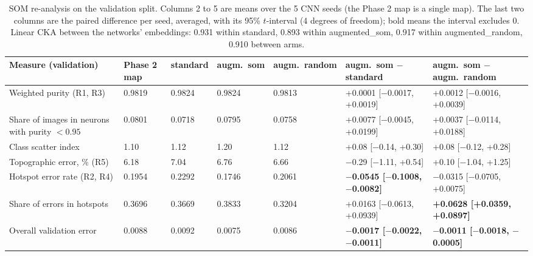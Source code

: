 \begin{table}[H]
\centering
\renewcommand{\arraystretch}{1.12}
\footnotesize
{\setlength{\tabcolsep}{3pt}\begin{tabular}{|>{\raggedright\arraybackslash}p{}|C{0.08\textwidth}|C{0.085\textwidth}|C{0.09\textwidth}|C{0.09\textwidth}|C{0.185\textwidth}|C{0.185\textwidth}|}
\hline
\textbf{Measure (validation)} & \textbf{Phase 2 map} & \textbf{standard} & \textbf{augm.\ som} & \textbf{augm.\ random} & \textbf{augm.\ som $-$ standard} & \textbf{augm.\ som $-$ augm.\ random} \\ \hline
Weighted purity (R1, R3) & 0.9819 & 0.9824 & 0.9824 & 0.9813 & +0.0001 [$-$0.0017, +0.0019] & +0.0012 [$-$0.0016, +0.0039] \\ \hline
Share of images in neurons with purity $<0.95$ & 0.0801 & 0.0718 & 0.0795 & 0.0758 & +0.0077 [$-$0.0045, +0.0199] & +0.0037 [$-$0.0114, +0.0188] \\ \hline
Class scatter index & 1.10 & 1.12 & 1.20 & 1.12 & +0.08 [$-$0.14, +0.30] & +0.08 [$-$0.12, +0.28] \\ \hline
Topographic error, \% (R5) & 6.18 & 7.04 & 6.76 & 6.66 & $-$0.29 [$-$1.11, +0.54] & +0.10 [$-$1.04, +1.25] \\ \hline
Hotspot error rate (R2, R4) & 0.1954 & 0.2292 & 0.1746 & 0.2061 & \textbf{$-$0.0545 [$-$0.1008, $-$0.0082]} & $-$0.0315 [$-$0.0705, +0.0075] \\ \hline
Share of errors in hotspots & 0.3696 & 0.3669 & 0.3833 & 0.3204 & +0.0163 [$-$0.0613, +0.0939] & \textbf{+0.0628 [+0.0359, +0.0897]} \\ \hline
Overall validation error & 0.0088 & 0.0092 & 0.0075 & 0.0086 & \textbf{$-$0.0017 [$-$0.0022, $-$0.0011]} & \textbf{$-$0.0011 [$-$0.0018, $-$0.0005]} \\ \hline
\end{tabular}}
\caption{SOM re-analysis on the validation split. Columns 2 to 5 are means over the 5 CNN seeds (the Phase 2 map is a single map). The last two columns are the paired difference per seed, averaged, with its 95\% $t$-interval (4 degrees of freedom); bold means the interval excludes 0. Linear CKA between the networks' embeddings: 0.931 within standard, 0.893 within augmented\_som, 0.917 within augmented\_random, 0.910 between arms.}
\label{tab:reanalysis}
\end{table}
